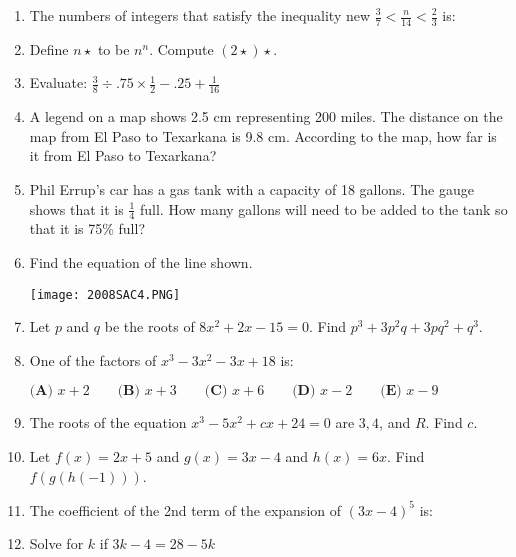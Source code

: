 \documentclass[../uilmath.tex]{subfiles}
\begin{document}
\begin{enumerate}[label=\bfseries\arabic*.]
    \item %
    The numbers of integers that satisfy the inequality new $\frac{3}{7}<\frac{n}{14}<\frac{2}{3}$ is: 

    \item %
    Define $n\star$ to be $n^n$. Compute $(2\star)\star$.

    \item %
    Evaluate: $\frac{3}{8}\div .75\times \frac{1}{2}-.25+\frac{1}{16}$

    \item %
    A legend on a map shows 2.5 cm representing 200 miles. The distance on the map from El Paso to Texarkana is 9.8 cm. According to the map, how far is it from El Paso to Texarkana?

    \item %
    Phil Errup's car has a gas tank with a capacity of 18 gallons. The gauge shows that it is $\frac{1}{4}$ full. How many gallons will need to be added to the tank so that it is 75\% full?

    \item %
    Find the equation of the line shown.
    \begin{center}
        \texttt{[image: 2008SAC4.PNG]}
    \end{center}

    \item %
    Let $p$ and $q$ be the roots of $8x^2+2x-15=0$. Find $p^3+3p^2q+3pq^2+q^3$.

    \item %
    One of the factors of $x^3-3x^2-3x+18$ is: 

    $\textbf{(A) } x+2 \qquad \textbf{(B) } x+3 \qquad \textbf{(C) } x+6 \qquad \textbf{(D) } x-2 \qquad \textbf{(E) } x-9$

    \item %
    The roots of the equation $x^3-5x^2+cx+24=0$ are $3,4$, and $R$. Find $c$.

    \item %
    Let $f(x)=2x+5$ and $g(x)=3x-4$ and $h(x)=6x$. Find $f(g(h(-1)))$.

    \item %
    The coefficient of the 2nd term of the expansion of $(3x-4)^5$ is: 

    \item %
    Solve for $k$ if $3k-4=28-5k$


\end{enumerate}
\end{document}
